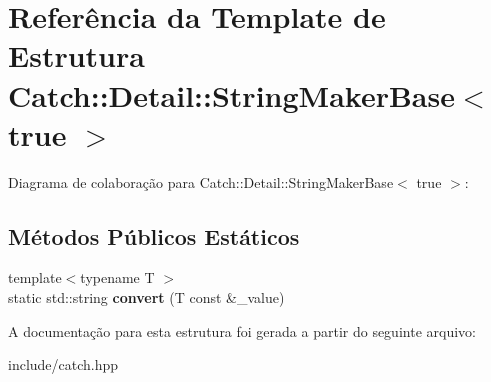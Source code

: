 \hypertarget{structCatch_1_1Detail_1_1StringMakerBase_3_01true_01_4}{}\section{Referência da Template de Estrutura Catch\+:\+:Detail\+:\+:String\+Maker\+Base$<$ true $>$}
\label{structCatch_1_1Detail_1_1StringMakerBase_3_01true_01_4}


Diagrama de colaboração para Catch\+:\+:Detail\+:\+:String\+Maker\+Base$<$ true $>$\+:
\subsection*{Métodos Públicos Estáticos}
\begin{DoxyCompactItemize}
\item 
{\footnotesize template$<$typename T $>$ }\\static std\+::string {\bfseries convert} (T const \&\+\_\+value)\hypertarget{structCatch_1_1Detail_1_1StringMakerBase_3_01true_01_4_af9b5fdf7fddd8c5c873caa819e5f00f6}{}\label{structCatch_1_1Detail_1_1StringMakerBase_3_01true_01_4_af9b5fdf7fddd8c5c873caa819e5f00f6}

\end{DoxyCompactItemize}


A documentação para esta estrutura foi gerada a partir do seguinte arquivo\+:\begin{DoxyCompactItemize}
\item 
include/catch.\+hpp\end{DoxyCompactItemize}
